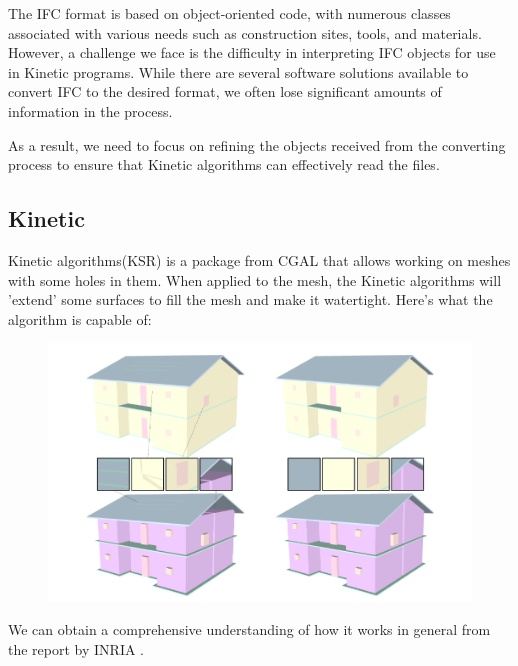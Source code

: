 \documentclass{article}
\begin{document}
The IFC format is based on object-oriented code, with numerous classes associated with various needs such as construction sites, tools, and materials.
However, a challenge we face is the difficulty in interpreting IFC objects for use in Kinetic programs. While there are several software solutions available to convert IFC to the desired format, 
we often lose significant amounts of information in the process.

As a result, we need to focus on refining the objects received from the converting process to ensure that Kinetic algorithms can effectively read the files.

\subsection{Kinetic}

Kinetic algorithms(KSR) is a package from CGAL that allows working on meshes with 
some holes in them. When applied to the mesh, the Kinetic algorithms will 'extend' some surfaces to fill the mesh and make it watertight. 
Here's what the algorithm is capable of:


\begin{figure}[H]
    
\includegraphics[scale =   0.3 ]{../../images/example_algorithm.png}

\end{figure}

We can obtain a comprehensive understanding of how it works in general from the report by INRIA \cite{yu:hal-03621896}.
\end{document}
